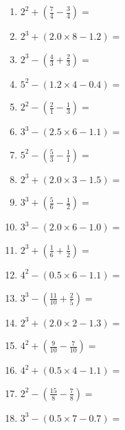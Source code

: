 \documentclass[12pt]{article}
\begin{document}
\begin{enumerate}
\item \large $ 2^{2} + (\frac{7}{4} - \frac{3}{4}) = $ \vspace{1.6cm}
\item \large $ 2^{3} + (2.0 \times 8 - 1.2) = $ \vspace{1.6cm}
\item \large $ 2^{3} - (\frac{4}{3} + \frac{2}{3}) = $ \vspace{1.6cm}
\item \large $ 5^{2} - (1.2 \times 4 - 0.4) = $ \vspace{1.6cm}
\newpage
\item \large $ 2^{2} - (\frac{2}{1} - \frac{1}{3}) = $ \vspace{1.6cm}
\item \large $ 3^{3} - (2.5 \times 6 - 1.1) = $ \vspace{1.6cm}
\item \large $ 5^{2} - (\frac{5}{3} - \frac{1}{1}) = $ \vspace{1.6cm}
\item \large $ 2^{3} + (2.0 \times 3 - 1.5) = $ \vspace{1.6cm}
\item \large $ 3^{3} + (\frac{5}{6} - \frac{1}{2}) = $ \vspace{1.6cm}
\item \large $ 3^{3} - (2.0 \times 6 - 1.0) = $ \vspace{1.6cm}
\item \large $ 2^{3} + (\frac{1}{6} + \frac{1}{2}) = $ \vspace{1.6cm}
\item \large $ 4^{2} - (0.5 \times 6 - 1.1) = $ \vspace{1.6cm}
\item \large $ 3^{3} - (\frac{11}{10} + \frac{2}{5}) = $ \vspace{1.6cm}
\item \large $ 2^{3} + (2.0 \times 2 - 1.3) = $ \vspace{1.6cm}
\newpage
\item \large $ 4^{2} + (\frac{9}{10} - \frac{7}{10}) = $ \vspace{1.6cm}
\item \large $ 4^{2} + (0.5 \times 4 - 1.1) = $ \vspace{1.6cm}
\item \large $ 2^{2} - (\frac{15}{8} - \frac{7}{8}) = $ \vspace{1.6cm}
\item \large $ 3^{3} - (0.5 \times 7 - 0.7) = $ \vspace{1.6cm}

\end{enumerate}
\end{document}
